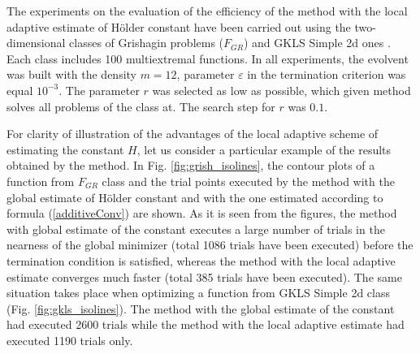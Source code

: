 \documentclass[procedia]{easychair}
\begin{document}
The experiments on the evaluation of the efficiency of the method with the local
adaptive estimate of Hölder constant have been carried out using the two-dimensional
classes of Grishagin problems (\(F_{GR}\)) \cite{grishaginClass} and GKLS Simple 2d ones \cite{gklsClass}. Each class
includes 100 multiextremal functions. In all experiments, the evolvent was built
with the density \(m = 12\), parameter \(\varepsilon\) in the termination criterion was equal \(10^{-3}\).
The parameter \(r\) was selected as low as possible, which given method solves all
problems of the class at. The search step for \(r\) was \(0.1\).
\par
For clarity of illustration of the advantages of the local adaptive scheme of estimating
the constant \(H\), let us consider a particular example of the results obtained by the method.
In Fig. \ref{fig:grish_isolines}, the contour plots of a function from \(F_{GR}\) class and the trial
points executed by the method with the global estimate of Hölder constant and with
the one estimated according to formula (\ref{additiveConv}) are shown. As it is
seen from the figures, the method with global estimate of the constant executes a
large number of trials in the nearness of the global minimizer (total 1086 trials
have been executed) before the termination condition is satisfied, whereas the method
with the local adaptive estimate converges much faster (total 385 trials have been executed).
The same situation takes place when optimizing a function from GKLS Simple 2d class (Fig. \ref{fig:gkls_isolines}).
The method with the global estimate of the constant had executed 2600 trials while
the method with the local adaptive estimate had executed 1190 trials only.
\end{document}
